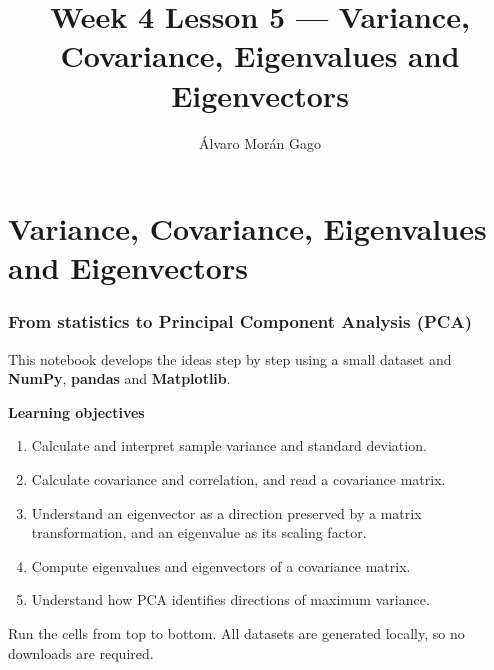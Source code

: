 \documentclass[11pt]{article}
\title{Week 4 Lesson 5 — Variance, Covariance, Eigenvalues and Eigenvectors}
\author{Álvaro Morán Gago}
\providecommand{\tightlist}{%
      \setlength{\itemsep}{0pt}\setlength{\parskip}{0pt}}
\begin{document}
    
    \maketitle
    
    

    

    \section{Variance, Covariance, Eigenvalues and
Eigenvectors}\label{variance-covariance-eigenvalues-and-eigenvectors}

\subsubsection{From statistics to Principal Component Analysis
(PCA)}\label{from-statistics-to-principal-component-analysis-pca}

This notebook develops the ideas step by step using a small dataset and
\textbf{NumPy}, \textbf{pandas} and \textbf{Matplotlib}.

\textbf{Learning objectives}

\begin{enumerate}
\def\labelenumi{\arabic{enumi}.}
\tightlist
\item
  Calculate and interpret sample variance and standard deviation.
\item
  Calculate covariance and correlation, and read a covariance matrix.
\item
  Understand an eigenvector as a direction preserved by a matrix
  transformation, and an eigenvalue as its scaling factor.
\item
  Compute eigenvalues and eigenvectors of a covariance matrix.
\item
  Understand how PCA identifies directions of maximum variance.
\end{enumerate}

Run the cells from top to bottom. All datasets are generated locally, so
no downloads are required.
\end{document}

